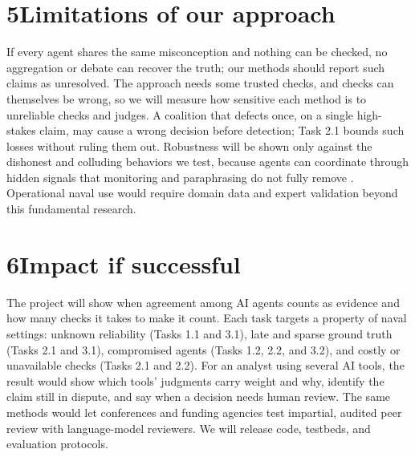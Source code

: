 \documentclass[11pt,letterpaper]{article}
\begin{document}
\section*{5\quad Limitations of our approach}
If every agent shares the same misconception and nothing can be checked, no aggregation or debate can recover the truth; our methods should report such claims as unresolved. The approach needs some trusted checks, and checks can themselves be wrong, so we will measure how sensitive each method is to unreliable checks and judges. A coalition that defects once, on a single high-stakes claim, may cause a wrong decision before detection; Task 2.1 bounds such losses without ruling them out. Robustness will be shown only against the dishonest and colluding behaviors we test, because agents can coordinate through hidden signals that monitoring and paraphrasing do not fully remove \cite{mathew2025hidden}. Operational naval use would require domain data and expert validation beyond this fundamental research.

\section*{6\quad Impact if successful}
The project will show when agreement among AI agents counts as evidence and how many checks it takes to make it count. Each task targets a property of naval settings: unknown reliability (Tasks 1.1 and 3.1), late and sparse ground truth (Tasks 2.1 and 3.1), compromised agents (Tasks 1.2, 2.2, and 3.2), and costly or unavailable checks (Tasks 2.1 and 2.2). For an analyst using several AI tools, the result would show which tools' judgments carry weight and why, identify the claim still in dispute, and say when a decision needs human review. The same methods would let conferences and funding agencies test impartial, audited peer review with language-model reviewers. We will release code, testbeds, and evaluation protocols.
\end{document}
